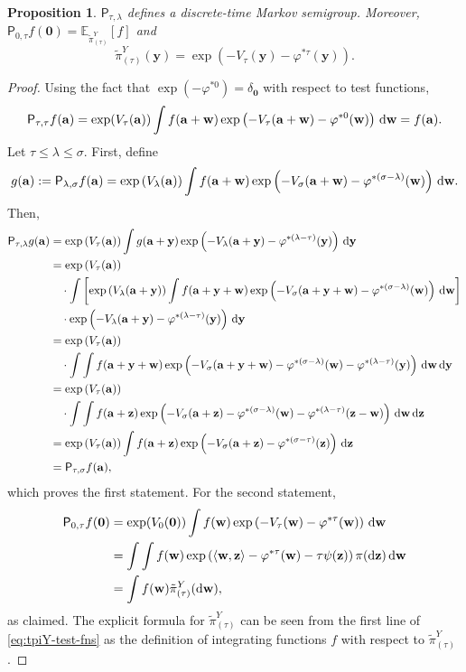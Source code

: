\documentclass[11pt]{article}
\newtheorem{proposition}{Proposition}
\newcommand{\inprod}[2]{\left\langle#1, #2\right\rangle}
\newcommand{\dd}{\textup{d}}
\newcommand{\Par}[1]{\left(#1\right)}
\newcommand{\0}{\mathbf{0}}
\newcommand{\1}{\mathbf{1}}
\newcommand{\va}{\mathbf{a}}
\newcommand{\vw}{\mathbf{w}}
\newcommand{\vy}{\mathbf{y}}
\newcommand{\vz}{\mathbf{z}}
\newcommand{\sfP}{\mathsf{P}}
\newcommand{\tpi}{\tilde{\pi}}
\begin{document}
\begin{proposition}\label{prop:renormalization-main}
$\sfP_{\tau, \lambda}$ defines a discrete-time Markov semigroup.  Moreover, $\sfP_{0, \tau}f(\mathbf{0})=\mathbb{E}_{\tpi_{(\tau)}^Y}[f]$ and
\[\tpi_{(\tau)}^Y(\vy)=\exp\Par{-V_\tau(\vy)-\varphi^{*\tau}(\vy)}.\]
\end{proposition}
\begin{proof}
Using the fact that $\exp\Par{-\varphi^{*0}}=\delta_{\mathbf{0}}$ with respect to test functions, 
\[\sfP_{\tau, \tau}f(\va)=\exp(V_\tau(\va))\int f(\va+\vw)\exp\Par{-V_\tau(\va+\vw)-\varphi^{*0}(\vw)}\,\dd\vw=f(\va).\]
Let $\tau\leq \lambda\leq \sigma$.  First, define
\[
    g(\va):=\sfP_{\lambda, \sigma}f(\va)
    =\exp\Par{V_\lambda(\va)}\int f(\va+\vw)\exp\Par{-V_\sigma(\va+\vw)-\varphi^{*(\sigma-\lambda)}(\vw)}\,\dd\vw.
\]
Then,
\begin{align*}
    \sfP_{\tau, \lambda}g(\va)
    &=\exp\Par{V_\tau(\va)}\int g(\va+\vy)\exp\Par{-V_\lambda(\va+\vy)-\varphi^{*(\lambda-\tau)}(\vy)}\,\dd\vy\\
    &=\exp\Par{V_\tau(\va)}\\
     &\quad  \cdot \int \left[ \exp\Par{V_\lambda(\va+\vy)}\int f(\va+\vy+\vw)\exp\Par{-V_\sigma(\va+\vy+\vw)-\varphi^{*(\sigma-\lambda)}(\vw)}\,\dd\vw  \right]\\
     &\quad \cdot \exp\Par{-V_\lambda(\va+\vy)-\varphi^{*(\lambda-\tau)}(\vy)}\,\dd\vy\\
     &=\exp\Par{V_\tau(\va)}\\
     &\quad \cdot \int\int f(\va+\vy+\vw) \exp\Par{-V_\sigma(\va+\vy+\vw)-\varphi^{*(\sigma-\lambda)}(\vw)-\varphi^{*(\lambda-\tau)}(\vy)}\,\dd\vw\,\dd\vy\\
     &=\exp\Par{V_\tau(\va)}\\
     &\quad \cdot \int\int f(\va+\vz) \exp\Par{-V_\sigma(\va+\vz)-\varphi^{*(\sigma-\lambda)}(\vw)-\varphi^{*(\lambda-\tau)}(\vz-\vw)}\,\dd\vw\,\dd\vz\\
     &=\exp\Par{V_\tau(\va)}\int f(\va+\vz)\exp\Par{-V_\sigma(\va+\vz)-\varphi^{*(\sigma-\tau)}(\vz)}\,\dd\vz\\
     &=\sfP_{\tau, \sigma}f(\va),
\end{align*}
which proves the first statement. For the second statement,
\begin{equation}\label{eq:tpiY-test-fns}
    \begin{aligned}
    \sfP_{0, \tau}f(\mathbf{0})
    &=\exp(V_0(\mathbf{0}))\int f(\vw)\exp\Par{-V_\tau(\vw)-\varphi^{*\tau}(\vw)}\,\dd\vw\\
    &=\int\int  f(\vw)\exp\Par{\inprod{\vw}{\vz}-\varphi^{*\tau}(\vw)-\tau \psi(\vz)}\pi(\dd\vz)\,\dd\vw\\
    &=\int f(\vw)\tpi_{(\tau)}^Y(\dd\vw),
\end{aligned}
\end{equation}
as claimed.  The explicit formula for $\tpi_{(\tau)}^Y$ can be seen from the first line of \eqref{eq:tpiY-test-fns} as the definition of integrating functions $f$ with respect to $\tpi_{(\tau)}^Y$.
\end{proof}
\end{document}
